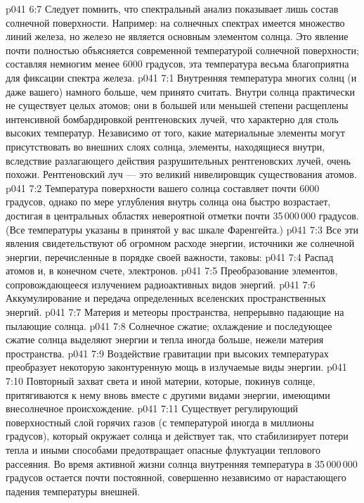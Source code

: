 \vs p041 6:7 \pc Следует помнить, что спектральный анализ показывает лишь состав солнечной поверхности. Например: на солнечных спектрах имеется множество линий железа, но железо не является основным элементом солнца. Это явление почти полностью объясняется современной температурой солнечной поверхности; составляя немногим менее 6000 градусов, эта температура весьма благоприятна для фиксации спектра железа.
\vs p041 7:1 Внутренняя температура многих солнц (и даже вашего) намного больше, чем принято считать. Внутри солнца практически не существует целых атомов; они в большей или меньшей степени расщеплены интенсивной бомбардировкой рентгеновских лучей, что характерно для столь высоких температур. Независимо от того, какие материальные элементы могут присутствовать во внешних слоях солнца, элементы, находящиеся внутри, вследствие разлагающего действия разрушительных рентгеновских лучей, очень похожи. Рентгеновский луч --- это великий нивелировщик существования атомов.
\vs p041 7:2 Температура поверхности вашего солнца составляет почти 6000 градусов, однако по мере углубления внутрь солнца она быстро возрастает, достигая в центральных областях невероятной отметки почти 35\,000\,000 градусов. (Все температуры указаны в принятой у вас шкале Фаренгейта.)
\vs p041 7:3 \pc Все эти явления свидетельствуют об огромном расходе энергии, источники же солнечной энергии, перечисленные в порядке своей важности, таковы:
\vs p041 7:4 \bibnobreakspace Распад атомов и, в конечном счете, электронов.
\vs p041 7:5 \bibnobreakspace Преобразование элементов, сопровождающееся излучением радиоактивных видов энергий.
\vs p041 7:6 \bibnobreakspace Аккумулирование и передача определенных вселенских пространственных энергий.
\vs p041 7:7 \bibnobreakspace Материя и метеоры пространства, непрерывно падающие на пылающие солнца.
\vs p041 7:8 \bibnobreakspace Солнечное сжатие; охлаждение и последующее сжатие солнца выделяют энергии и тепла иногда больше, нежели материя пространства.
\vs p041 7:9 \bibnobreakspace Воздействие гравитации при высоких температурах преобразует некоторую законтуренную мощь в излучаемые виды энергии.
\vs p041 7:10 \bibnobreakspace Повторный захват света и иной материи, которые, покинув солнце, притягиваются к нему вновь вместе с другими видами энергии, имеющими внесолнечное происхождение.
\vs p041 7:11 \pc Существует регулирующий поверхностный слой горячих газов (с температурой иногда в миллионы градусов), который окружает солнца и действует так, что стабилизирует потери тепла и иными способами предотвращает опасные флуктуации теплового рассеяния. Во время активной жизни солнца внутренняя температура в 35\,000\,000 градусов остается почти постоянной, совершенно независимо от нарастающего падения температуры внешней.
